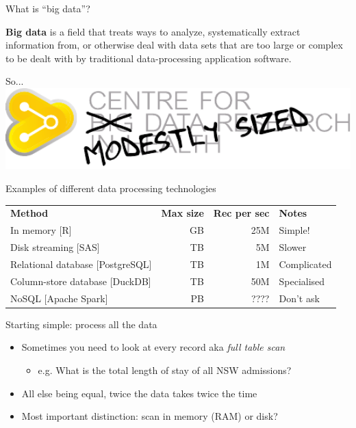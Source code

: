\documentclass[aspectratio=169,12pt,usepdftitle=false]{beamer} %
\begin{document}
\begin{frame}{What is ``big data''?}
\centering
\begin{minipage}{0.8\textwidth}
\textbf{Big data} is a field that treats ways to analyze,
systematically extract information from, or otherwise deal with data sets
that are too large or complex to be dealt with by traditional
data-processing application software.
\end{minipage}
\end{frame}

\begin{frame}{So...}
\centering
\includegraphics[width=1.0\textwidth]
	{ref/cmsdrh.pdf}
\end{frame}

\begin{frame}{Examples of different data processing technologies}
    \begin{tabular}{lrrl}
	\textbf{Method} & \textbf{Max size} & \textbf{Rec per sec} &
		\textbf{Notes} \\
	In memory [R] & GB & 25M & Simple! \\
	Disk streaming [SAS] & TB & 5M & Slower \\
	Relational database [PostgreSQL] & TB & 1M & Complicated \\
	Column-store database [DuckDB] & TB & 50M & Specialised \\
	NoSQL [Apache Spark] & PB & ???? & Don't ask \\
    \end{tabular}
\end{frame}

\begin{frame}{Starting simple: process all the data}
    \begin{itemize}
	\item Sometimes you need to look at every record aka \emph{full table scan}
	    \begin{itemize}
		\item e.g. What is the total length of stay of all NSW admissions?
	    \end{itemize}
	\item All else being equal, twice the data takes twice the time
	\item Most important distinction: scan in memory (RAM) or disk?
    \end{itemize}
\end{frame}
\end{document}
